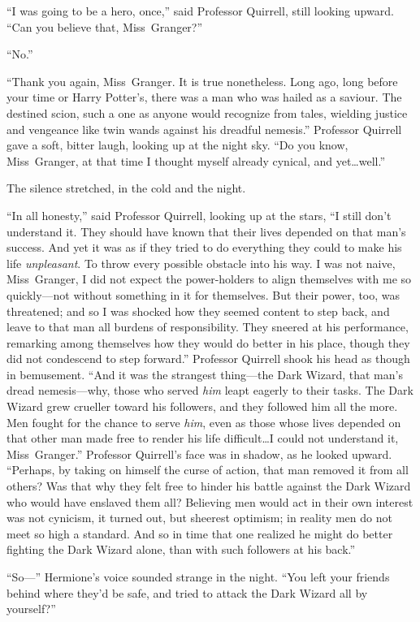 “I was going to be a hero, once,” said Professor Quirrell, still looking upward. “Can you believe that, Miss~Granger?”

“No.”

“Thank you again, Miss~Granger. It is true nonetheless. Long ago, long before your time or Harry Potter’s, there was a man who was hailed as a saviour. The destined scion, such a one as anyone would recognize from tales, wielding justice and vengeance like twin wands against his dreadful nemesis.” Professor Quirrell gave a soft, bitter laugh, looking up at the night sky. “Do you know, Miss~Granger, at that time I thought myself already cynical, and yet…well.”

The silence stretched, in the cold and the night.

“In all honesty,” said Professor Quirrell, looking up at the stars, “I still don’t understand it. They should have known that their lives depended on that man’s success. And yet it was as if they tried to do everything they could to make his life \emph{unpleasant}. To throw every possible obstacle into his way. I was not naive, Miss~Granger, I did not expect the power-holders to align themselves with me so quickly—not without something in it for themselves. But their power, too, was threatened; and so I was shocked how they seemed content to step back, and leave to that man all burdens of responsibility. They sneered at his performance, remarking among themselves how they would do better in his place, though they did not condescend to step forward.” Professor Quirrell shook his head as though in bemusement. “And it was the strangest thing—the Dark Wizard, that man’s dread nemesis—why, those who served \emph{him} leapt eagerly to their tasks. The Dark Wizard grew crueller toward his followers, and they followed him all the more. Men fought for the chance to serve \emph{him}, even as those whose lives depended on that other man made free to render his life difficult…I could not understand it, Miss~Granger.” Professor Quirrell’s face was in shadow, as he looked upward. “Perhaps, by taking on himself the curse of action, that man removed it from all others? Was that why they felt free to hinder his battle against the Dark Wizard who would have enslaved them all? Believing men would act in their own interest was not cynicism, it turned out, but sheerest optimism; in reality men do not meet so high a standard. And so in time that one realized he might do better fighting the Dark Wizard alone, than with such followers at his back.”

“So—” Hermione’s voice sounded strange in the night. “You left your friends behind where they’d be safe, and tried to attack the Dark Wizard all by yourself?”

